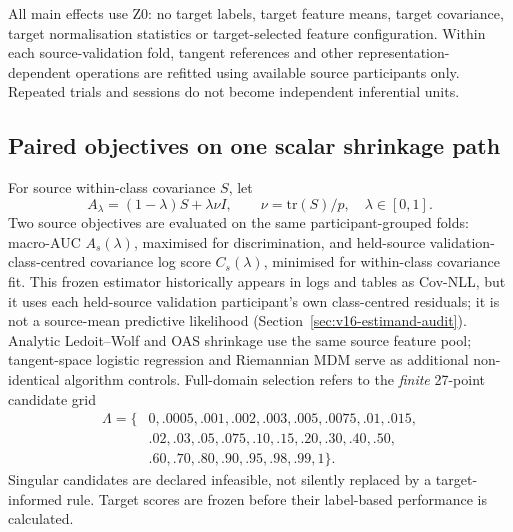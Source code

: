 \documentclass[12pt,a4paper]{article}
\begin{document}
All main effects use Z0: no target labels, target feature means, target
covariance, target normalisation statistics or target-selected feature
configuration. Within each source-validation fold, tangent references and
other representation-dependent operations are refitted using available
source participants only. Repeated trials and sessions do not become
independent inferential units.

\subsection{Paired objectives on one scalar shrinkage path}
For source within-class covariance \(S\), let
\[
 A_\lambda=(1-\lambda)S+\lambda\nu I,\qquad
 \nu=\mathrm{tr}(S)/p,\quad \lambda\in[0,1].
\]
Two source objectives are evaluated on the same participant-grouped folds:
macro-AUC \(A_s(\lambda)\), maximised for discrimination, and held-source validation-class-centred covariance log score
\(C_s(\lambda)\), minimised for within-class covariance fit.
This frozen estimator historically appears in logs and tables as
Cov-NLL, but it uses each held-source validation participant's own
class-centred residuals; it is not a source-mean predictive likelihood
(Section~\ref{sec:v16-estimand-audit}). Analytic Ledoit--Wolf and OAS shrinkage use the same
source feature pool; tangent-space logistic regression and Riemannian
MDM serve as additional non-identical algorithm controls. Full-domain
selection refers to the \emph{finite} 27-point candidate grid
\[
\begin{aligned}
\Lambda=\{&0,.0005,.001,.002,.003,.005,.0075,.01,.015,\\
&.02,.03,.05,.075,.10,.15,.20,.30,.40,.50,\\
&.60,.70,.80,.90,.95,.98,.99,1\}.
\end{aligned}
\]
Singular candidates are declared infeasible, not silently replaced by
a target-informed rule. Target scores are frozen before their
label-based performance is calculated.





\end{document}
